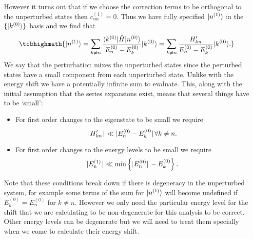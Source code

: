     However it turns out that if we choose the correction terms to be orthogonal to the unperturbed states then \(c_{nn}^{(1)} = 0\).
    Thus we have fully specified \(\vert {n^{(1)}} \rangle\) in the \(\{\vert {k^{(0)}} \rangle\}\) basis and we find that
    \[
        \tcbhighmath{\ket{n^{(1)}} = \sum_{k\ne n} \frac{\bra{k^{(0)}} \operator{H} \ket{n^{(0)}}}{E_n^{(0)} - E_k^{(0)}}\ket{k^{(0)}} = \sum_{k\ne n}\frac{H'_{kn}}{E_n^{(0)} - E_k^{(0)}}\ket{k^{(0)}}.}
    \]
    We say that the perturbation mixes the unperturbed states since the perturbed states have a small component from each unperturbed state.
    Unlike with the energy shift we have a potentially infinite sum to evaluate.
    This, along with the initial assumption that the series expansions exist, means that several things have to be `small':
    \begin{itemize}
        \item For first order changes to the eigenstate to be small we require
        \[\abs*{H'_{kn}} \ll \abs*{E_n^{(0)} - E_k^{(0)}} \forall k\ne n.\]
        \item For first order changes to the energy levels to be small we require
        \[\abs*{E_n^{(1)}} \ll \min \left\{ \abs*{E_n^{(0)}} - E_{k}^{(0)} \right\}.\]
    \end{itemize}
    Note that these conditions break down if there is degeneracy in the unperturbed system, for example some terms of the sum for \(\vert {n^{(1)}} \rangle\) will become undefined if \(E_k^{(0)} = E_n^{(0)}\) for \(k \ne n\).
    However we only need the particular energy level for the shift that we are calculating to be non-degenerate for this analysis to be correct.
    Other energy levels can be degenerate but we will need to treat them specially when we come to calculate their energy shift.
    
